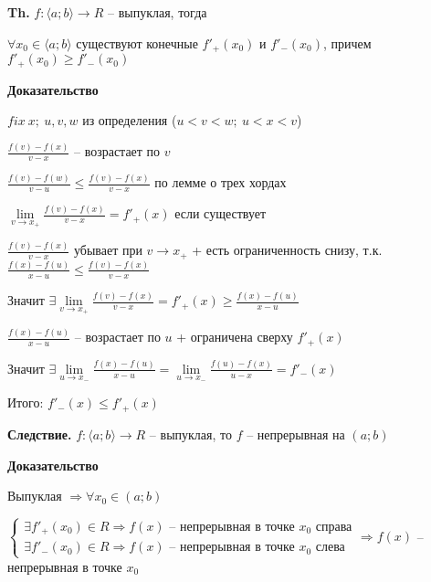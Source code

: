 \documentclass[14pt, letter paper]{article}
\newcommand{\q}[1]{\langle #1 \rangle}
\begin{document}
\vspace{5mm}

\textbf{Th.} $f : \q{a; b} \rightarrow R$ -- выпуклая, тогда 

$\forall x_0 \in \q{a; b}$ существуют конечные $f'_+(x_0)$ и $f'_-(x_0)$, причем $f'_+(x_0) \geq f'_-(x_0)$

\begin{center}
    \textbf{Доказательство}
\end{center}

$fix\ x;\ u, v, w$ из определения ($u < v < w;\ u < x < v$)

$\frac{f(v) - f(x)}{v - x}$ -- возрастает по $v$

$\frac{f(v) - f(w)}{v - u} \leq \frac{f(v) - f(x)}{v - x}$ по лемме о трех хордах

$\lim\limits_{v \rightarrow x_+} \frac{f(v) - f(x)}{v - x} = f'_+(x)$ если существует

$\frac{f(v) - f(x)}{v - x}$ убывает при $v \rightarrow x_+$ + есть ограниченность снизу, т.к. $\frac{f(x) - f(u)}{x - u} \leq \frac{f(v) - f(x)}{v - x}$

Значит $\exists \lim\limits_{v \rightarrow x_+} \frac{f(v) - f(x)}{v - x} = f'_+(x) \geq \frac{f(x) - f(u)}{x - u}$

\vspace{2mm}

$\frac{f(x) - f(u)}{x - u}$ -- возрастает по $u$ + ограничена сверху $f'_+(x)$

Значит $\exists \lim\limits_{u \rightarrow x_-} \frac{f(x) - f(u)}{x - u} = \lim\limits_{u \rightarrow x_-} \frac{f(u) - f(x)}{u - x} = f'_-(x)$

Итого: $f'_-(x) \leq f'_+(x)$

\vspace{5mm}

\textbf{Следствие.} $f : \q{a; b} \rightarrow R$ -- выпуклая, то $f$ -- непрерывная на $(a; b)$

\begin{center}
    \textbf{Доказательство}
\end{center}

Выпуклая $\Rightarrow \forall x_0 \in (a; b)$

$\begin{cases}
    \exists f'_+(x_0) \in R \Rightarrow f(x) \text{ -- непрерывная в точке } x_0 \text{ справа} \\
    \exists f'_-(x_0) \in R \Rightarrow f(x) \text{ -- непрерывная в точке } x_0 \text{ слева}
\end{cases} \Rightarrow f(x)$ -- непрерывная в точке $x_0$
\end{document}
